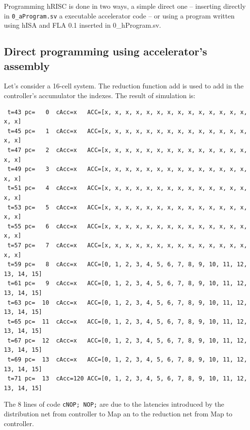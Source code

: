 Programming hRISC is done in two ways, a simple direct one -- inserting directly in {\tt 0\_aProgram.sv} a executable accelerator code -- or using a program written using hISA and FLA 0.1 inserted in 0\_hProgram.sv.

\subsection{Direct programming using accelerator's assembly}

\begin{exemplu}
Let's consider a 16-cell system. The reduction function add is used to add in the controller's accumulator the indexes.
{\em 
{}
}
The result of simulation is:
{\small
\begin{verbatim}
 t=43 pc=   0  cAcc=x   ACC=[x, x, x, x, x, x, x, x, x, x, x, x, x, x, x, x] 
 t=45 pc=   1  cAcc=x   ACC=[x, x, x, x, x, x, x, x, x, x, x, x, x, x, x, x] 
 t=47 pc=   2  cAcc=x   ACC=[x, x, x, x, x, x, x, x, x, x, x, x, x, x, x, x] 
 t=49 pc=   3  cAcc=x   ACC=[x, x, x, x, x, x, x, x, x, x, x, x, x, x, x, x] 
 t=51 pc=   4  cAcc=x   ACC=[x, x, x, x, x, x, x, x, x, x, x, x, x, x, x, x] 
 t=53 pc=   5  cAcc=x   ACC=[x, x, x, x, x, x, x, x, x, x, x, x, x, x, x, x] 
 t=55 pc=   6  cAcc=x   ACC=[x, x, x, x, x, x, x, x, x, x, x, x, x, x, x, x] 
 t=57 pc=   7  cAcc=x   ACC=[x, x, x, x, x, x, x, x, x, x, x, x, x, x, x, x] 
 t=59 pc=   8  cAcc=x   ACC=[0, 1, 2, 3, 4, 5, 6, 7, 8, 9, 10, 11, 12, 13, 14, 15] 
 t=61 pc=   9  cAcc=x   ACC=[0, 1, 2, 3, 4, 5, 6, 7, 8, 9, 10, 11, 12, 13, 14, 15] 
 t=63 pc=  10  cAcc=x   ACC=[0, 1, 2, 3, 4, 5, 6, 7, 8, 9, 10, 11, 12, 13, 14, 15] 
 t=65 pc=  11  cAcc=x   ACC=[0, 1, 2, 3, 4, 5, 6, 7, 8, 9, 10, 11, 12, 13, 14, 15] 
 t=67 pc=  12  cAcc=x   ACC=[0, 1, 2, 3, 4, 5, 6, 7, 8, 9, 10, 11, 12, 13, 14, 15] 
 t=69 pc=  13  cAcc=x   ACC=[0, 1, 2, 3, 4, 5, 6, 7, 8, 9, 10, 11, 12, 13, 14, 15] 
 t=71 pc=  13  cAcc=120 ACC=[0, 1, 2, 3, 4, 5, 6, 7, 8, 9, 10, 11, 12, 13, 14, 15]
\end{verbatim}
}
The 8 lines of code {\tt cNOP; NOP;} are due to the latencies introduced by the distribution net from controller to Map an to the reduction net from Map to controller.


\end{exemplu}
